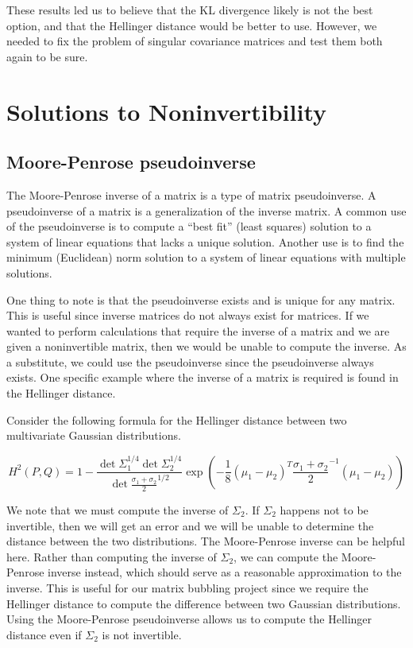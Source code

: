 \documentclass{article}
\newcommand*{\Pn}[1]{\left( #1 \right)}
\begin{document}
These results led us to believe that the KL divergence likely is not the best
option, and that the Hellinger distance would be better to use. However, we
needed to fix the problem of singular covariance matrices and test them both
again to be sure.

\section{Solutions to Noninvertibility}

\subsection{Moore-Penrose pseudoinverse}

The Moore-Penrose inverse of a matrix is a type of matrix
pseudoinverse.\cite{wikimoore} A pseudoinverse of a matrix is a generalization
of the inverse matrix. A common use of the pseudoinverse is to compute a ``best
fit'' (least squares) solution to a system of linear equations that lacks a
unique solution. Another use is to find the minimum (Euclidean) norm solution
to a system of linear equations with multiple solutions.

One thing to note is that the pseudoinverse exists and is unique for any
matrix. This is useful since inverse matrices do not always exist for matrices.
If we wanted to perform calculations that require the inverse of a matrix and
we are given a noninvertible matrix, then we would be unable to compute the
inverse. As a substitute, we could use the pseudoinverse since the
pseudoinverse always exists. One specific example where the inverse of a matrix
is required is found in the Hellinger distance.

Consider the following formula for the Hellinger distance between two
multivariate Gaussian distributions.

\begin{equation}
    H^2(P,Q)=1-\frac{\det\Sigma_1^{1/4}\det\Sigma_2^{1/4}}{\det \frac{\sigma_1+\sigma_2}{2}^{1/2}}
    \exp\Pn{-\frac18(\mu_1-\mu_2)^T\frac{\sigma_1+\sigma_2}{2}^{-1}(\mu_1-\mu_2)}
\end{equation}

We note that we must compute the inverse of $\Sigma_2$. If $\Sigma_2$ happens
not to be invertible, then we will get an error and we will be unable to
determine the distance between the two distributions. The Moore-Penrose inverse
can be helpful here. Rather than computing the inverse of $\Sigma_2$, we can
compute the Moore-Penrose inverse instead, which should serve as a reasonable
approximation to the inverse. This is useful for our matrix bubbling project
since we require the Hellinger distance to compute the difference between two
Gaussian distributions. Using the Moore-Penrose pseudoinverse allows us to
compute the Hellinger distance even if $\Sigma_2$ is not invertible.
\end{document}
